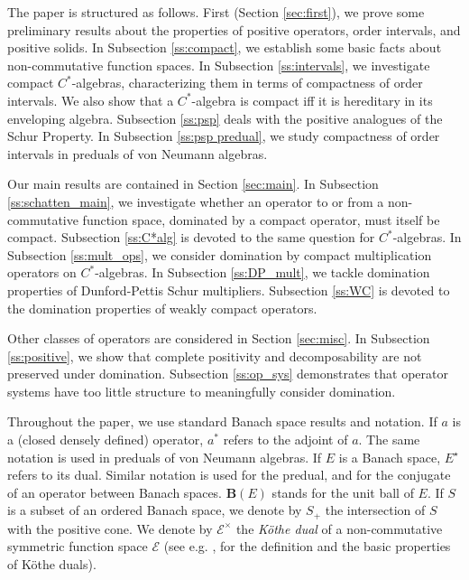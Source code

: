 \documentclass[12pt]{amsart}
\theoremstyle{plain}
\theoremstyle{definition}
\newcommand{\ce}{\mathcal E}
\newcommand{\ball}{\mathbf{B}}
\begin{document}
The paper is structured as follows. First (Section \ref{sec:first}), we prove some
preliminary results about the properties of positive operators, order intervals,
and positive solids. In Subsection \ref{ss:compact}, we establish some
basic facts about non-commutative function spaces. In Subsection \ref{ss:intervals},
we investigate compact $C^*$-algebras, characterizing them in terms of compactness
of order intervals. We also show that a $C^*$-algebra is compact iff it is
hereditary in its enveloping algebra. Subsection \ref{ss:psp} deals with the
positive analogues of the Schur Property. In Subsection \ref{ss:psp predual},
we study compactness of order intervals in preduals of von Neumann algebras.

Our main results are contained in Section \ref{sec:main}. In Subsection
\ref{ss:schatten_main}, we investigate whether an operator to or from a
non-commutative function space, dominated by a compact operator, must
itself be compact. Subsection \ref{ss:C*alg} is devoted to the same question
for $C^*$-algebras. In Subsection \ref{ss:mult_ops}, we consider domination
by compact multiplication operators on $C^*$-algebras. In Subsection \ref{ss:DP_mult},
we tackle domination properties of Dunford-Pettis Schur multipliers.
Subsection \ref{ss:WC} is devoted to the domination properties of
weakly compact operators.

Other classes of operators are considered in Section \ref{sec:misc}.
In Subsection \ref{ss:positive},
we show that complete positivity and decomposability are not preserved under
domination. Subsection \ref{ss:op_sys} demonstrates that operator systems
have too little structure to meaningfully consider domination.

Throughout the paper, we use standard Banach space results and notation.
If $a$ is a (closed densely defined) operator, $a^*$ refers to the
adjoint of $a$. The same notation is used in preduals of von Neumann algebras.
If $E$ is a Banach space, $E^\star$ refers to its dual. Similar notation
is used for the predual, and for the conjugate of an operator
between Banach spaces. $\ball(E)$
stands for the unit ball of $E$. If $S$ is a subset of an ordered Banach
space, we denote by $S_+$ the intersection of $S$ with the positive cone.
We denote by $\ce^\times$ the \emph{ K\"othe dual} of a non-commutative
symmetric function space $\ce$  (see e.g. \cite{DDdP93}, \cite{deP} for the
definition and the basic properties of K\"othe duals).
\end{document}
